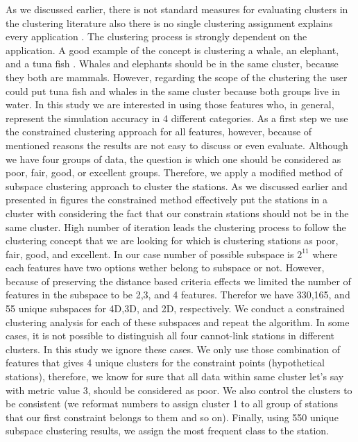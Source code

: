 As we discussed earlier, there is not standard measures for evaluating clusters in the clustering literature also there is no single clustering assignment explains every application \citep{Dy_2004_MLR,Jain_1988_Book,Hartigan_1985_JOC}. The clustering process is strongly dependent on the application. A good example of the concept is clustering a whale, an elephant, and a tuna fish \citep{Jain_1999,Watanabe_1985_Book}.  Whales and elephants should be in the same cluster, because they both are mammals. However, regarding the scope of the clustering the user could put tuna fish and whales in the same cluster because both groups live in water. In this study we are interested in using those features who, in general, represent the simulation accuracy in 4 different categories. As a first step we use the constrained \kmeans{} clustering approach for all features, however, because of mentioned reasons the results are not easy to discuss or even evaluate. Although we have four groups of data, the question is which one should be considered as poor, fair, good, or excellent groups. Therefore, we apply a modified method of subspace clustering approach to cluster the stations. As we discussed earlier and presented in figures the constrained \kmeans{} method effectively put the stations in a cluster with considering the fact that our constrain stations should not be in the same cluster. High number of iteration leads the clustering process to follow the clustering concept that we are looking for which is clustering stations as poor, fair, good, and excellent. In our case number of possible subspace is $2^{11}$ where each features have two options wether belong to subspace or not. However, because of preserving the distance based criteria effects we limited the number of features in the subspace to be 2,3, and 4 features. Therefor we have 330,165, and 55 unique subspaces for 4D,3D, and 2D, respectively. We conduct a constrained \kmeans{} clustering analysis for each of these subspaces and repeat the algorithm. In some cases, it is not possible to distinguish all four cannot-link stations in different clusters. In this study we ignore these cases. We only use those combination of features that gives 4 unique clusters for the constraint points (hypothetical stations), therefore, we know for sure that all data within same cluster let's say with metric value 3, should be considered as poor. We also control the clusters to be consistent (we reformat numbers to assign cluster 1 to all group of stations that our first constraint belongs to them and so on). Finally, using 550 unique subspace clustering results, we assign the most frequent class to the station. 

